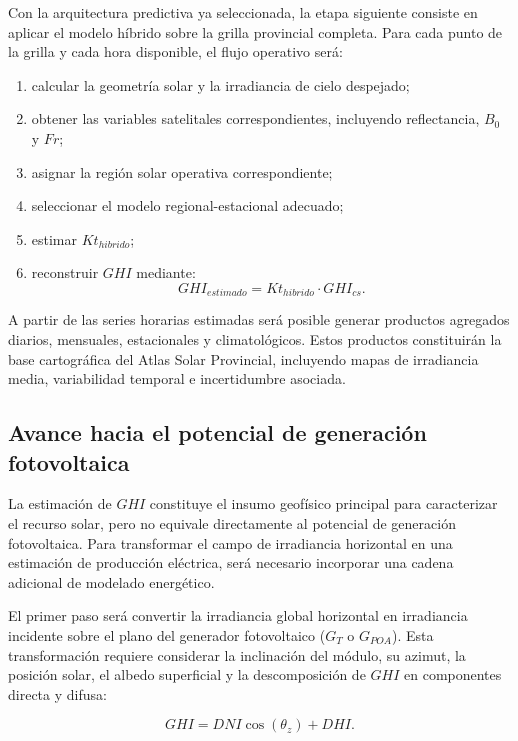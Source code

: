 \documentclass[../main.tex]{subfiles}
\begin{document}
Con la arquitectura predictiva ya seleccionada, la etapa siguiente consiste en aplicar el modelo híbrido sobre la grilla provincial completa. Para cada punto de la grilla y cada hora disponible, el flujo operativo será:

\begin{enumerate}
    \item calcular la geometría solar y la irradiancia de cielo despejado;
    \item obtener las variables satelitales correspondientes, incluyendo reflectancia, $B_0$ y $Fr$;
    \item asignar la región solar operativa correspondiente;
    \item seleccionar el modelo regional-estacional adecuado;
    \item estimar $Kt_{hibrido}$;
    \item reconstruir $GHI$ mediante:
    \begin{equation}
    GHI_{estimado} = Kt_{hibrido} \cdot GHI_{cs}.
    \end{equation}
\end{enumerate}

A partir de las series horarias estimadas será posible generar productos agregados diarios, mensuales, estacionales y climatológicos. Estos productos constituirán la base cartográfica del Atlas Solar Provincial, incluyendo mapas de irradiancia media, variabilidad temporal e incertidumbre asociada.

\subsection{Avance hacia el potencial de generación fotovoltaica}

La estimación de $GHI$ constituye el insumo geofísico principal para caracterizar el recurso solar, pero no equivale directamente al potencial de generación fotovoltaica. Para transformar el campo de irradiancia horizontal en una estimación de producción eléctrica, será necesario incorporar una cadena adicional de modelado energético.

El primer paso será convertir la irradiancia global horizontal en irradiancia incidente sobre el plano del generador fotovoltaico ($G_T$ o $G_{POA}$). Esta transformación requiere considerar la inclinación del módulo, su azimut, la posición solar, el albedo superficial y la descomposición de $GHI$ en componentes directa y difusa:

\begin{equation}
GHI = DNI \cos(\theta_z) + DHI.
\end{equation}
\end{document}
